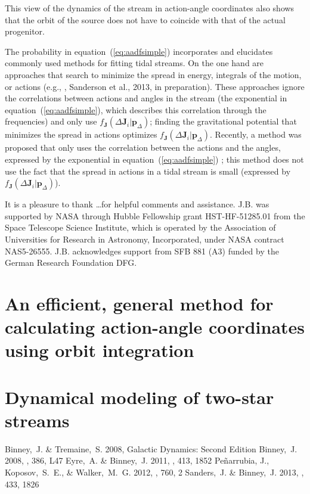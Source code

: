 \documentclass[12pt,preprint]{aastex}
\newcommand{\etal}{et al.}
\newcommand{\eg}{e.g.}
\newcommand{\eqnname}{equation}
\renewcommand{\vec}[1]{\ensuremath{\mathbf{#1}}}
\newcommand{\vecj}{\ensuremath{\vec{J}}}
\newcommand{\paramsdiff}{\ensuremath{\vec{p}_\Delta}}
\begin{document}
This view of the dynamics of the stream in action-angle coordinates
also shows that the orbit of the source does not have to coincide with
that of the actual progenitor. 

The probability in \eqnname~(\ref{eq:aadfsimple}) incorporates and
elucidates commonly used methods for fitting tidal streams. On the one
hand are approaches that search to minimize the spread in energy,
integrals of the motion, or actions (\eg,
\citealt{Binney08a,Penarrubia12a}, Sanderson \etal, 2013, in
preparation). These approaches ignore the correlations between actions
and angles in the stream (the exponential in
\eqnname~(\ref{eq:aadfsimple}), which describes this correlation
through the frequencies) and only use $f_{\vecj}(\Delta
\vecj_i|\paramsdiff)$; finding the gravitational potential that
minimizes the spread in actions optimizes $f_{\vecj}(\Delta
\vecj_i|\paramsdiff)$. Recently, a method was proposed that only uses
the correlation between the actions and the angles, expressed by the
exponential in \eqnname~(\ref{eq:aadfsimple}) \citep{Sanders13a}; this
method does not use the fact that the spread in actions in a tidal
stream is small (expressed by $f_{\vecj}(\Delta
\vecj_i|\paramsdiff)$).



\acknowledgements It is a pleasure to thank \dots for helpful comments
and assistance. J.B. was supported by NASA through Hubble Fellowship
grant HST-HF-51285.01 from the Space Telescope Science Institute,
which is operated by the Association of Universities for Research in
Astronomy, Incorporated, under NASA contract NAS5-26555. J.B.
acknowledges support from SFB 881 (A3) funded by the German
Research Foundation DFG.


\appendix

\section{An efficient, general method for calculating action-angle coordinates using orbit integration}\label{sec:aa}


\section{Dynamical modeling of two-star streams}\label{sec:twostar}


\begin{thebibliography}{}

  Binney,~J. \& Tremaine,~S. 2008, Galactic Dynamics: Second Edition
  Binney,~J. 2008, \mnras, 386, L47
  Eyre,~A. \& Binney,~J. 2011, \mnras, 413, 1852
\bibitem[Pe{\~n}arrubia \etal(2012)]{Penarrubia12a}
  Pe{\~n}arrubia, J., Koposov,~S.~E., \& Walker,~M.~G. 2012, \apj, 760, 2
  Sanders,~J. \& Binney,~J. 2013, \mnras, 433, 1826
\end{thebibliography}
\end{document}
